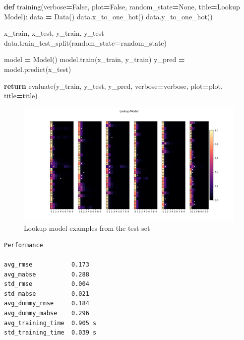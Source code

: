 \documentclass[
]{article}
\newenvironment{Shaded}{\begin{snugshade}}{\end{snugshade}}
\newcommand{\ControlFlowTok}[1]{\textcolor[rgb]{0.13,0.29,0.53}{\textbf{#1}}}
\newcommand{\KeywordTok}[1]{\textcolor[rgb]{0.13,0.29,0.53}{\textbf{#1}}}
\newcommand{\NormalTok}[1]{#1}
\newcommand{\OperatorTok}[1]{\textcolor[rgb]{0.81,0.36,0.00}{\textbf{#1}}}
\newcommand{\StringTok}[1]{\textcolor[rgb]{0.31,0.60,0.02}{#1}}
\newcommand{\VariableTok}[1]{\textcolor[rgb]{0.00,0.00,0.00}{#1}}
\begin{document}
\begin{Shaded}
\begin{Highlighting}[]
\KeywordTok{def}\NormalTok{ training(verbose}\OperatorTok{=}\VariableTok{False}\NormalTok{, plot}\OperatorTok{=}\VariableTok{False}\NormalTok{, random\_state}\OperatorTok{=}\VariableTok{None}\NormalTok{, title}\OperatorTok{=}\StringTok{\textquotesingle{}Lookup Model\textquotesingle{}}\NormalTok{):}
\NormalTok{    data }\OperatorTok{=}\NormalTok{ Data()}
\NormalTok{    data.x\_to\_one\_hot()}
\NormalTok{    data.y\_to\_one\_hot()}

\NormalTok{    x\_train, x\_test, y\_train, y\_test }\OperatorTok{=}\NormalTok{ data.train\_test\_split(random\_state}\OperatorTok{=}\NormalTok{random\_state)}

\NormalTok{    model }\OperatorTok{=}\NormalTok{ Model()}
\NormalTok{    model.train(x\_train, y\_train)}
\NormalTok{    y\_pred }\OperatorTok{=}\NormalTok{ model.predict(x\_test)}

    \ControlFlowTok{return}\NormalTok{ evaluate(y\_train, y\_test, y\_pred,}
\NormalTok{                    verbose}\OperatorTok{=}\NormalTok{verbose, plot}\OperatorTok{=}\NormalTok{plot, title}\OperatorTok{=}\NormalTok{title)}
\end{Highlighting}
\end{Shaded}

\begin{figure}
\centering
\includegraphics{figures/lookup_model.png}
\caption{Lookup model examples from the test set}
\end{figure}

\begin{verbatim}
Performance

avg_rmse           0.173
avg_mabse          0.288
std_rmse           0.004
std_mabse          0.021
avg_dummy_rmse     0.184
avg_dummy_mabse    0.296
avg_training_time  0.905 s
std_training_time  0.039 s
\end{verbatim}
\end{document}
